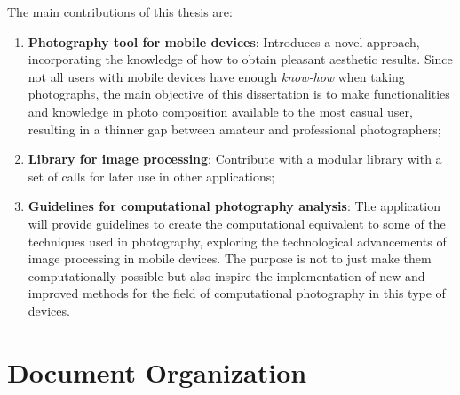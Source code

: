 The main contributions of this thesis are:
\begin{enumerate}
	\item \textbf{Photography tool for mobile devices}: Introduces a novel approach, incorporating the knowledge of how to obtain pleasant aesthetic results. Since not all users with mobile devices have enough \emph{know-how} when taking photographs, the main objective of this dissertation is to make functionalities and knowledge in photo composition available to the most casual user, resulting in a thinner gap between amateur and professional photographers;

	\item \textbf{Library for image processing}: Contribute with a modular library with a set of calls for later use in other applications;
	
	\item \textbf{Guidelines for computational photography analysis}: The application will provide guidelines to create the computational equivalent to some of the techniques used in photography, exploring the technological advancements of image processing in mobile devices. The purpose is not to just make them computationally possible but also inspire the implementation of new and improved methods for the field of computational photography in this type of devices.
	
\end{enumerate}

\section{Document Organization}
\label{sec:aperture}

